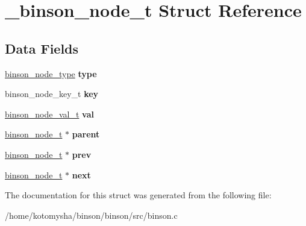 \hypertarget{struct__binson__node__t}{\section{\-\_\-binson\-\_\-node\-\_\-t Struct Reference}
\label{struct__binson__node__t}
}
\subsection*{Data Fields}
\begin{DoxyCompactItemize}
\item 
\hypertarget{struct__binson__node__t_a57017128a908d9881158638f8b530171}{\hyperlink{binson_8h_a60ffe9b8062798661e80fb5e653a26a9}{binson\-\_\-node\-\_\-type} {\bfseries type}}\label{struct__binson__node__t_a57017128a908d9881158638f8b530171}

\item 
\hypertarget{struct__binson__node__t_ac8469c2eb7c1cae38954c1261a654c60}{binson\-\_\-node\-\_\-key\-\_\-t {\bfseries key}}\label{struct__binson__node__t_ac8469c2eb7c1cae38954c1261a654c60}

\item 
\hypertarget{struct__binson__node__t_a8b7bef1c1490e207ead841a8aee04f24}{\hyperlink{union__binson__node__val__t}{binson\-\_\-node\-\_\-val\-\_\-t} {\bfseries val}}\label{struct__binson__node__t_a8b7bef1c1490e207ead841a8aee04f24}

\item 
\hypertarget{struct__binson__node__t_a0bd1bf04949f41206ca4a37d41de307b}{\hyperlink{struct__binson__node__t}{binson\-\_\-node\-\_\-t} $\ast$ {\bfseries parent}}\label{struct__binson__node__t_a0bd1bf04949f41206ca4a37d41de307b}

\item 
\hypertarget{struct__binson__node__t_a8f7f448fc84a152d1b4d3cf82b423b5b}{\hyperlink{struct__binson__node__t}{binson\-\_\-node\-\_\-t} $\ast$ {\bfseries prev}}\label{struct__binson__node__t_a8f7f448fc84a152d1b4d3cf82b423b5b}

\item 
\hypertarget{struct__binson__node__t_af7e6efb8b726aed01dbc09286cb75773}{\hyperlink{struct__binson__node__t}{binson\-\_\-node\-\_\-t} $\ast$ {\bfseries next}}\label{struct__binson__node__t_af7e6efb8b726aed01dbc09286cb75773}

\end{DoxyCompactItemize}


The documentation for this struct was generated from the following file\-:\begin{DoxyCompactItemize}
\item 
/home/kotomysha/binson/binson/src/binson.\-c\end{DoxyCompactItemize}
